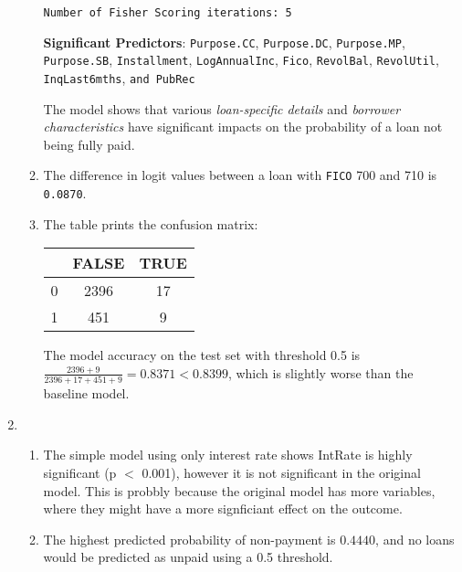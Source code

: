 \documentclass{article}
\begin{document}
\begin{enumerate}[label=\alph*.]
\begin{enumerate}[label=\roman*.]
\begin{verbatim}
Number of Fisher Scoring iterations: 5
                        \end{verbatim}

                        \textbf{Significant Predictors}: \texttt{Purpose.CC}, \texttt{Purpose.DC}, \texttt{Purpose.MP}, \texttt{Purpose.SB}, \texttt{Installment}, \texttt{LogAnnualInc}, \texttt{Fico}, \texttt{RevolBal}, \texttt{RevolUtil}, \texttt{InqLast6mths}, \texttt{and PubRec}

                        The model shows that various \textit{loan-specific details} and \textit{borrower characteristics} have significant impacts on the probability of a loan not being fully paid.


                  \item The difference in logit values between a loan with \texttt{FICO} 700 and 710 is \texttt{0.0870}.

                  \item The table prints the confusion matrix:
                        \begin{table}[H]
                              \centering
                              \begin{tabular}{ccc}
                                      & FALSE & TRUE \\
                                    \hline
                                    0 & 2396  & 17   \\
                                    1 & 451   & 9
                              \end{tabular}
                        \end{table}
                        The model accuracy on the test set with threshold 0.5 is $\frac{2396 + 9}{2396 + 17 + 451 + 9}= 0.8371 < 0.8399$, which is slightly worse than the baseline model.

            \end{enumerate}

      \item
            \begin{enumerate}[label=\roman*.]
                  \item The simple model using only interest rate shows IntRate is highly significant (p $<$ 0.001), however it is not significant in the original model. This is probbly because the original model has more variables, where they might have a more signficiant effect on the outcome.

                  \item The highest predicted probability of non-payment is $0.4440$, and no loans would be predicted as unpaid using a 0.5 threshold.
            \end{enumerate}
\end{enumerate}
\end{document}
